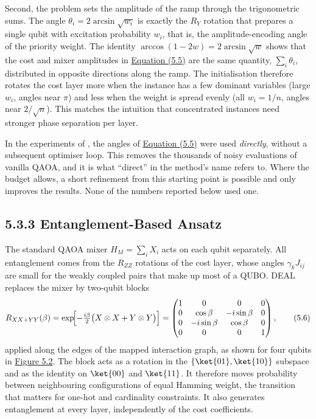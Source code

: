 \documentclass{report}
\theoremstyle{plain}
\theoremstyle{definition}
\theoremstyle{remark}
\begin{document}
Second, the problem sets the amplitude of the ramp through the trigonometric sums. The angle $\theta_{i}=2\arcsin\sqrt{w_{i}}$ is exactly the $R_{Y}$ rotation that prepares a single qubit with excitation probability $w_{i}$, that is, the amplitude-encoding angle of the priority weight. The identity $\arccos(1-2w)=2\arcsin\sqrt{w}$ shows that the cost and mixer amplitudes in \hyperref[eq:nisq:init]{Equation (5.5)} are the same quantity, $\sum_{i}\theta_{i}$, distributed in opposite directions along the ramp. The initialisation therefore rotates the cost layer more when the instance has a few dominant variables (large $w_{i}$, angles near $\pi$) and less when the weight is spread evenly (all $w_{i}=1/n$, angles near $2/\sqrt{n}$). This matches the intuition that concentrated instances need stronger phase separation per layer.

In the experiments of \cite{guo2025deal}, the angles of \hyperref[eq:nisq:init]{Equation (5.5)} were used \emph{directly}, without a subsequent optimiser loop. This removes the thousands of noisy evaluations of vanilla QAOA, and it is what ``direct'' in the method's name refers to. Where the budget allows, a short refinement from this starting point is possible and only improves the results. None of the numbers reported below used one.

\subsection{5.3.3 Entanglement-Based Ansatz}\label{sec:nisq:ansatz}

The standard QAOA mixer $H_M=\sum_{i}X_{i}$ acts on each qubit separately. All entanglement comes from the $R_{ZZ}$ rotations of the cost layer, whose angles $\gamma_{k}J_{ij}$ are small for the weakly coupled pairs that make up most of a QUBO. DEAL replaces the mixer by two-qubit blocks
\hypertarget{eq:nisq:mixer}{}\[
  R_{XX+YY}(\beta) = \exp\!\Bigl[-\tfrac{i\beta}{2}\bigl(X\otimes X + Y\otimes Y\bigr)\Bigr]
  = \begin{pmatrix} 1 & 0 & 0 & 0\\ 0 & \cos\beta & -i\sin\beta & 0\\ 0 & -i\sin\beta & \cos\beta & 0\\ 0&0&0&1\end{pmatrix},
\tag{5.6}\]
applied along the edges of the mapped interaction graph, as shown for four qubits in \hyperref[fig:nisq:deal-ansatz]{Figure 5.2}. The block acts as a rotation in the $\{\ket{01},\ket{10}\}$ subspace and as the identity on $\ket{00}$ and $\ket{11}$. It therefore moves probability between neighbouring configurations of equal Hamming weight, the transition that matters for one-hot and cardinality constraints. It also generates entanglement at every layer, independently of the cost coefficients.
\end{document}
